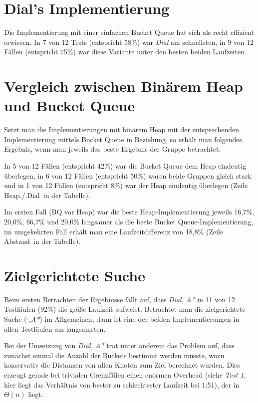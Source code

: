 \documentclass{scrartcl}
\begin{document}
\section{Dial's Implementierung}

Die Implementierung mit einer einfachen Bucket Queue hat sich als recht 
effizient erwiesen.
In 7 von 12 Tests (entspricht 58\%) war \emph{Dial} am schnellsten, in 
9 von 12 Fällen (entspricht 75\%) war diese Variante unter den besten
beiden Laufzeiten.

\section{Vergleich zwischen Binärem Heap und Bucket Queue}

Setzt man die Implementierungen mit binärem Heap mit der entsprechenden 
Implementierung mittels Bucket Queue  in Beziehung, so erhält man folgendes
Ergebnis, wenn man jeweils das beste Ergebnis der Gruppe betrachtet:

In 5 von 12 Fällen (entspricht 42\%) war die Bucket Queue dem Heap eindeutig überlegen,
in 6 von 12 Fällen (entspricht 50\%) waren beide Gruppen gleich stark und
in 1 von 12 Fällen (entspricht 8\%) war der Heap eindeutig überlegen
 (Zeile \glqq Heap./.Dial\grqq\ in der Tabelle).

Im ersten Fall (BQ vor Heap) war die beste Heap-Implementierung
jeweils 16{,}7\%, 20{,}0\%, 66{,}7\% und 20{,}0\% langsamer als die beste
Bucket Queue-Implementierung, im umgekehrten Fall erhält 
man eine Laufzeitdifferenz von 18{,}8\% (Zeile \glqq Abstand\grqq\ in der Tabelle).

\section{Zielgerichtete Suche}

Beim ersten Betrachten der Ergebnisse fällt auf, dass \emph{Dial, A*} in
11 von 12 Testläufen (92\%) die größe Laufzeit aufweist.
Betrachtet man die zielgerichtete Suche (\emph{$\cdot$,A*}) im Allgemeinen,
dann ist eine der beiden Implementierungen in allen Testläufen am langsamsten.

Bei der Umsetzung von \emph{Dial, A*} trat unter anderem das Problem auf,
dass zunächst einmal die Anzahl der Buckets bestimmt werden musste, wozu
konservativ die Distanzen von allen Knoten zum Ziel berechnet wurden.
Dies erzeugt gerade bei trivialen Grenzfällen einen enormen Overhead
(siehe \emph{Test 1}, hier liegt das Verhältnis von bester zu 
schlechtester Laufzeit bei 1:51), der in $\Theta(n)$ liegt. 
\end{document}
